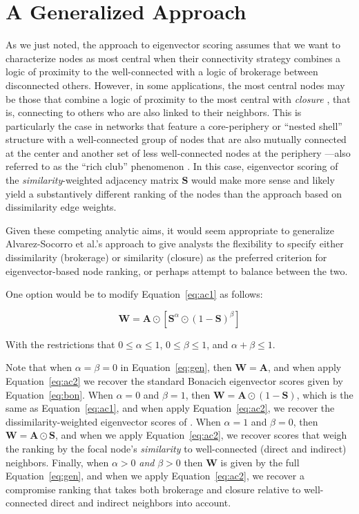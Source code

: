 \documentclass[12pt]{article}
\begin{document}
\section*{A Generalized Approach}
As we just noted, the \citet{alvarez-socorro2015eigencentrality-66c} approach to eigenvector scoring assumes that we want to characterize nodes as most central when their connectivity strategy combines a logic of proximity to the well-connected with a logic of brokerage between disconnected others. However, in some applications, the most central nodes may be those that combine a logic of proximity to the most central with \textit{closure} \citep{coleman1990foundations-124}, that is, connecting to others who are also linked to their neighbors. This is particularly the case in networks that feature a core-periphery or ``nested shell'' structure with a well-connected group of nodes that are also mutually connected at the center and another set of less well-connected nodes at the periphery \citep{borgatti2000models-3c1}---also referred to as the ``rich club'' phenomenon \citep{colizza2006detecting}. In this case, eigenvector scoring of the \textit{similarity}-weighted adjacency matrix $\mathbf{S}$ would make more sense and likely yield a substantively different ranking of the nodes than the \citet{alvarez-socorro2015eigencentrality-66c} approach based on dissimilarity edge weights. 

Given these competing analytic aims, it would seem appropriate to generalize Alvarez-Socorro et al.'s approach to give analysts the flexibility to specify either dissimilarity (brokerage) or similarity (closure) as the preferred criterion for eigenvector-based node ranking, or perhaps attempt to balance between the two. 

One option would be to modify Equation~\ref{eq:ac1} as follows:

\begin{equation}
    \mathbf{W} = \mathbf{A} \odot \left[\mathbf{S}^\alpha \odot (1 - \mathbf{S})^\beta\right]
    \label{eq:gen}
\end{equation}

With the restrictions that $0 \le \alpha \le 1$, $0 \le \beta \le 1$, and $\alpha + \beta \le 1$.

Note that when $\alpha = \beta = 0$ in Equation~\ref{eq:gen}, then  $\mathbf{W} = \mathbf{A}$, and when apply Equation~\ref{eq:ac2} we recover the standard Bonacich eigenvector scores given by Equation~\ref{eq:bon}. When $\alpha = 0$ and $\beta = 1$, then $\mathbf{W} = \mathbf{A} \odot (1 - \mathbf{S})$, which is the same as Equation~\ref{eq:ac1}, and when apply Equation~\ref{eq:ac2}, we recover the dissimilarity-weighted eigenvector scores of \citet{alvarez-socorro2015eigencentrality-66c}. When $\alpha = 1$ and $\beta = 0$, then $\mathbf{W} = \mathbf{A} \odot \mathbf{S}$, and when we apply Equation~\ref{eq:ac2}, we recover scores that weigh the ranking by the focal node's \textit{similarity} to well-connected (direct and indirect) neighbors. Finally, when $\alpha > 0$ \textit{and} $\beta > 0$ then $\mathbf{W}$ is given by the full Equation~\ref{eq:gen}, and when we apply Equation~\ref{eq:ac2}, we recover a compromise ranking that takes both brokerage and closure relative to well-connected direct and indirect neighbors into account. 
\end{document}
